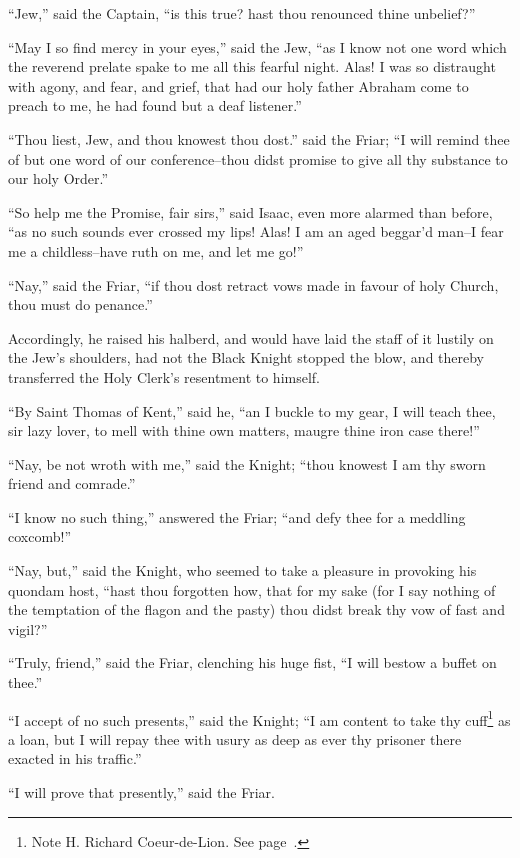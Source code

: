 ``Jew,'' said the Captain, ``is this true? hast thou renounced thine
unbelief?''

``May I so find mercy in your eyes,'' said the Jew, ``as I know not one
word which the reverend prelate spake to me all this fearful night.
Alas! I was so distraught with agony, and fear, and grief, that had our
holy father Abraham come to preach to me, he had found but a deaf
listener.''

``Thou liest, Jew, and thou knowest thou dost.'' said the Friar; ``I
will remind thee of but one word of our conference--thou didst promise
to give all thy substance to our holy Order.''

``So help me the Promise, fair sirs,'' said Isaac, even more alarmed
than before, ``as no such sounds ever crossed my lips! Alas! I am an
aged beggar'd man--I fear me a childless--have ruth on me, and let me
go!''

``Nay,'' said the Friar, ``if thou dost retract vows made in favour of
holy Church, thou must do penance.''

Accordingly, he raised his halberd, and would have laid the staff of it
lustily on the Jew's shoulders, had not the Black Knight stopped the
blow, and thereby transferred the Holy Clerk's resentment to himself.

``By Saint Thomas of Kent,'' said he, ``an I buckle to my gear, I will
teach thee, sir lazy lover, to mell with thine own matters, maugre thine
iron case there!''

``Nay, be not wroth with me,'' said the Knight; ``thou knowest I am thy
sworn friend and comrade.''

``I know no such thing,'' answered the Friar; ``and defy thee for a
meddling coxcomb!''

``Nay, but,'' said the Knight, who seemed to take a pleasure in
provoking his quondam host, ``hast thou forgotten how, that for my sake
(for I say nothing of the temptation of the flagon and the pasty) thou
didst break thy vow of fast and vigil?''

``Truly, friend,'' said the Friar, clenching his huge fist, ``I will
bestow a buffet on thee.''

``I accept of no such presents,'' said the Knight; ``I am content to
take thy cuff\footnote{Note H. Richard Coeur-de-Lion. See
page~\pageref{noteCXXXII}.} as a loan, but I will repay thee with usury as
deep as ever thy prisoner there exacted in his traffic.''

``I will prove that presently,'' said the Friar.

